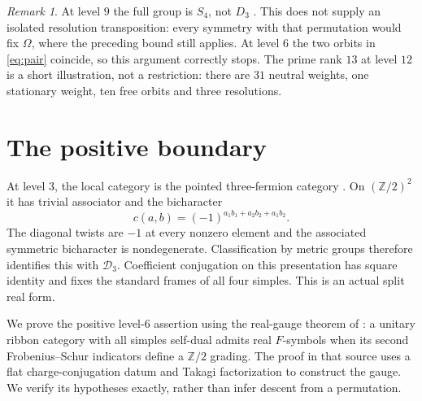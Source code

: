 \documentclass[11pt]{amsart}
\theoremstyle{remark}
\newtheorem{remark}[theorem]{Remark}
\newcommand{\Z}{\mathbb Z}
\newcommand{\D}{\mathcal D}
\begin{document}
\begin{remark}
At level $9$ the full group is $S_4$, not $D_3$
\cite[Theorem~1.4, Lemma~5.3]{Edie}. This does not supply an isolated
resolution transposition: every symmetry with that permutation would
fix $\Omega$, where the preceding bound still applies.
At level $6$ the two orbits in \eqref{eq:pair} coincide, so this
argument correctly stops. The prime rank $13$ at level $12$ is a short
illustration, not a restriction: there are $31$ neutral weights, one
stationary weight, ten free orbits and three resolutions.
\end{remark}

\section{The positive boundary}\label{sec:boundary}

At level $3$, the local category is the pointed three-fermion category
\cite[Lemma~2.15]{Edie}. On $(\Z/2)^2$ it has trivial associator and
the bicharacter
\[
 c(a,b)=(-1)^{a_1b_1+a_2b_2+a_1b_2}.
\]
The diagonal twists are $-1$ at every nonzero element and the associated
symmetric bicharacter is nondegenerate. Classification by metric groups
therefore identifies this with $\D_3$. Coefficient conjugation on this
presentation has square identity and fixes the standard frames of all
four simples. This is an actual split real form.

We prove the positive level-$6$ assertion using the real-gauge theorem
of \cite[Corollary~5]{BHPreal}: a unitary ribbon category with all simples
self-dual admits real $F$-symbols when its second Frobenius--Schur
indicators define a $\Z/2$ grading. The proof in that source uses a flat
charge-conjugation datum and Takagi factorization to construct the gauge.
We verify its hypotheses exactly, rather than infer descent from a
permutation.
\end{document}
